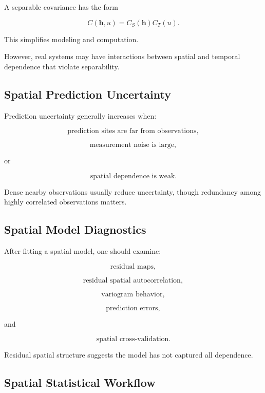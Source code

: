 A separable covariance has the form

\[
\boxed{
C
(
\mathbf{h},
u
)
=
C_S(\mathbf{h})
C_T(u).
}
\]

This simplifies modeling and computation.

However, real systems may have interactions between spatial and temporal
dependence that violate separability.

\subsection{Spatial Prediction Uncertainty}
\label{subsec:spatial-prediction-uncertainty}

Prediction uncertainty generally increases when:

\[
\boxed{
\text{prediction sites are far from observations},
}
\]

\[
\boxed{
\text{measurement noise is large},
}
\]

or

\[
\boxed{
\text{spatial dependence is weak}.
}
\]

Dense nearby observations usually reduce uncertainty, though redundancy
among highly correlated observations matters.

\subsection{Spatial Model Diagnostics}
\label{subsec:spatial-model-diagnostics}

After fitting a spatial model, one should examine:

\[
\boxed{
\text{residual maps},
}
\]

\[
\boxed{
\text{residual spatial autocorrelation},
}
\]

\[
\boxed{
\text{variogram behavior},
}
\]

\[
\boxed{
\text{prediction errors},
}
\]

and

\[
\boxed{
\text{spatial cross-validation}.
}
\]

Residual spatial structure suggests the model has not captured all
dependence.

\subsection{Spatial Statistical Workflow}
\label{subsec:spatial-statistical-workflow}

